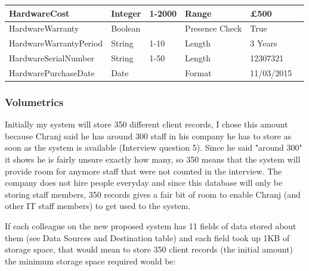 \begin{table}[H]
{\begin{tabular}{|p{4cm}|p{2cm}|p{2cm}|p{3cm}|p{3cm}|p{3cm}|}
HardwareCost                       & Integer                                 & 1-2000                               & Range                                    & £500                  &                       \\ \hline
HardwareWarranty                    & Boolean                                 &                                      & Presence Check                           & True                  &                       \\ \hline
HardwareWarrantyPeriod              & String                                  & 1-10                                 & Length                                   & 3 Years               &                       \\ \hline
HardwareSerialNumber                & String                                  & 1-50                                 & Length                                   & 12307321              &                       \\ \hline
HardwarePurchaseDate                & Date                                  &                                  & Format                                   & 11/03/2015              &                       \\ \hline
\end{tabular}
}
\end{table}

\subsubsection{Volumetrics}

Initially my system will store 350 different client records, I chose this amount because Chranj said he has around 300 staff in his company he has to store as soon as the system is available (Interview question 5). Since he said "around 300" it shows he is fairly unsure exactly how many, so 350 means that the system will provide room for anymore staff that were not counted in the interview. The company does not hire people everyday and since this database will only be storing staff members, 350 records gives a fair bit of room to enable Chranj (and other IT staff members) to get used to the system.

If each colleague on the new proposed system has 11 fields of data stored about them (see Data Sources and Destination table) and each field took up 1KB of storage space, that would mean to store 350 client records (the initial amount) the minimum storage space required would be:

